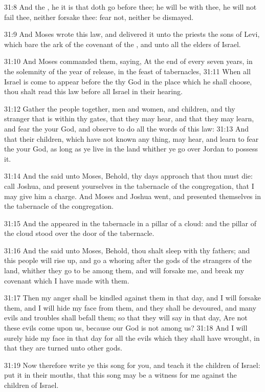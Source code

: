 31:8 And the \LORD, he it is that doth go before thee; he will be with thee, he will not fail thee, neither forsake thee: fear not, neither be dismayed.

31:9 And Moses wrote this law, and delivered it unto the priests the sons of Levi, which bare the ark of the covenant of the \LORD, and unto all the elders of Israel.

31:10 And Moses commanded them, saying, At the end of every seven years, in the solemnity of the year of release, in the feast of tabernacles, 31:11 When all Israel is come to appear before the \LORD thy God in the place which he shall choose, thou shalt read this law before all Israel in their hearing.

31:12 Gather the people together, men and women, and children, and thy stranger that is within thy gates, that they may hear, and that they may learn, and fear the \LORD your God, and observe to do all the words of this law: 31:13 And that their children, which have not known any thing, may hear, and learn to fear the \LORD your God, as long as ye live in the land whither ye go over Jordan to possess it.

31:14 And the \LORD said unto Moses, Behold, thy days approach that thou must die: call Joshua, and present yourselves in the tabernacle of the congregation, that I may give him a charge. And Moses and Joshua went, and presented themselves in the tabernacle of the congregation.

31:15 And the \LORD appeared in the tabernacle in a pillar of a cloud: and the pillar of the cloud stood over the door of the tabernacle.

31:16 And the \LORD said unto Moses, Behold, thou shalt sleep with thy fathers; and this people will rise up, and go a whoring after the gods of the strangers of the land, whither they go to be among them, and will forsake me, and break my covenant which I have made with them.

31:17 Then my anger shall be kindled against them in that day, and I will forsake them, and I will hide my face from them, and they shall be devoured, and many evils and troubles shall befall them; so that they will say in that day, Are not these evils come upon us, because our God is not among us?  31:18 And I will surely hide my face in that day for all the evils which they shall have wrought, in that they are turned unto other gods.

31:19 Now therefore write ye this song for you, and teach it the children of Israel: put it in their mouths, that this song may be a witness for me against the children of Israel.

